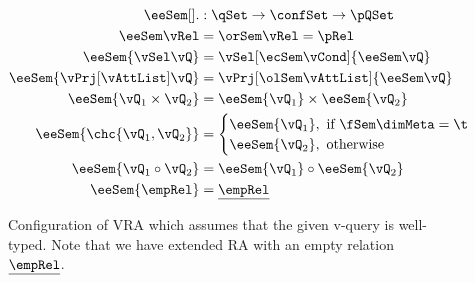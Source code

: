 \begin{figure}
\begin{alignat*}{1}
\eeSem [] . &: \qSet \to \confSet \to \pQSet\\
%
\eeSem \vRel &= \orSem \vRel = \pRel\\
\eeSem {\vSel \vQ}  &= \vSel [\ecSem \vCond] {\eeSem \vQ}\\
%
\eeSem {\vPrj [\vAttList] \vQ} &= \vPrj [\olSem \vAttList] {\eeSem \vQ}\\
%
\eeSem {{\vQ_1} \times {\vQ_2}} &= \eeSem {\vQ_1} \times \eeSem {\vQ_2}\\
%
%
\eeSem {\chc {\vQ_1, \vQ_2}} &= 
	\begin{cases}
		\eeSem {\vQ_1}, \text{ if } \fSem \dimMeta = \t\\
		\eeSem {\vQ_2}, \text{ otherwise}
	\end{cases}\\
%
\eeSem {{\vQ_1} \circ {\vQ_2}} &= \eeSem {\vQ_1} \circ \eeSem {\vQ_2}\\
%
\eeSem {\empRel} &= \underline {\empRel}
\end{alignat*}
\caption{Configuration of VRA which assumes that the given v-query
is well-typed. 
Note that we have extended RA with an empty relation $\underline {\empRel}$.}
\label{fig:v-alg-conf-sem}
\end{figure}
